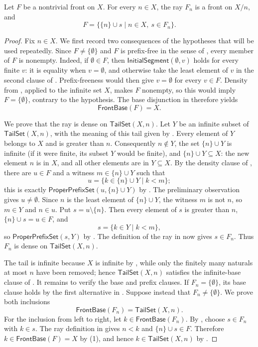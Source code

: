 \begin{lemma}
Let $F$ be a nontrivial front on $X$.  For every $n\in X$, the ray
$F_n$ is a front on $X/n$, and
\[
F=\bigl\{\{n\}\cup s\mid n\in X,\ s\in F_n\bigr\}.
\]
\end{lemma}
\begin{proof}
Fix $n\in X$.  We first record two consequences of the hypotheses that will
be used repeatedly.  Since $F\ne\{\emptyset\}$ and $F$ is prefix-free in
the sense of , every member of $F$ is nonempty.  Indeed, if
$\emptyset\in F$, then $\mathsf{InitialSegment}(\emptyset,v)$ holds for
every finite $v$: it is equality when $v=\emptyset$, and otherwise take the
least element of $v$ in the second clause of .
Prefix-freeness would then give $v=\emptyset$ for every $v\in F$.  Density
from , applied to the infinite set $X$, makes $F$ nonempty,
so this would imply $F=\{\emptyset\}$, contrary to the hypothesis.  The
base disjunction in  therefore yields
\[
\mathsf{FrontBase}(F)=X.
\tag{1}
\]

We prove that the ray is dense on $\mathsf{TailSet}(X,n)$.  Let $Y$ be an
infinite subset of $\mathsf{TailSet}(X,n)$, with the meaning of this tail
given by .  Every element of $Y$ belongs to $X$ and is
greater than $n$.  Consequently $n\notin Y$, the set $\{n\}\cup Y$ is
infinite (if it were finite, its subset $Y$ would be finite), and
$\{n\}\cup Y\subseteq X$: the new element $n$ is in $X$, and all other
elements are in $Y\subseteq X$.  By the density clause of ,
there are $u\in F$ and a witness $m\in\{n\}\cup Y$ such that
\[
 u=\{k\in\{n\}\cup Y\mid k<m\};
\]
this is exactly $\mathsf{ProperPrefixSet}(u,\{n\}\cup Y)$ by
.  The preliminary observation gives
$u\ne\emptyset$.  Since $n$ is the least element of $\{n\}\cup Y$, the
witness $m$ is not $n$, so $m\in Y$ and $n\in u$.  Put
$s=u\setminus\{n\}$.  Then every element of $s$ is greater than $n$,
$\{n\}\cup s=u\in F$, and
\[
 s=\{k\in Y\mid k<m\},
\]
so $\mathsf{ProperPrefixSet}(s,Y)$ by .  The
definition of the ray in  now gives $s\in F_n$.  Thus
$F_n$ is dense on $\mathsf{TailSet}(X,n)$.

The tail is infinite because $X$ is infinite by , while only
the finitely many naturals at most $n$ have been removed; hence
$\mathsf{TailSet}(X,n)$ satisfies the infinite-base clause of .
It remains to verify the base and prefix clauses.  If
$F_n=\{\emptyset\}$, its base clause holds by the first alternative in
.  Suppose instead that $F_n\ne\{\emptyset\}$.  We prove
both inclusions
\[
\mathsf{FrontBase}(F_n)=\mathsf{TailSet}(X,n).
\tag{2}
\]
For the inclusion from left to right, let $k\in\mathsf{FrontBase}(F_n)$.
By , choose $s\in F_n$ with $k\in s$.  The ray
definition in  gives $n<k$ and
$\{n\}\cup s\in F$.  Therefore $k\in\mathsf{FrontBase}(F)=X$ by (1),
and hence $k\in\mathsf{TailSet}(X,n)$ by .


\end{proof}
